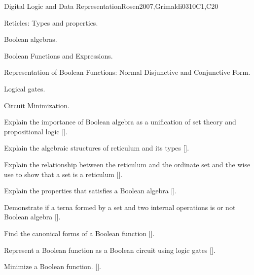 \begin{syllabus}
\begin{unit}{Digital Logic and Data Representation}{}{Rosen2007,Grimaldi03}{10}{C1,C20}
    \begin{topics}
     \item Reticles: Types and properties.
     \item Boolean algebras.
     \item Boolean Functions and Expressions.
     \item Representation of Boolean Functions: Normal Disjunctive and Conjunctive Form.
     \item Logical gates.
     \item Circuit Minimization.
    \end{topics}
 
    \begin{learningoutcomes}
     \item Explain the importance of Boolean algebra as a unification of set theory and propositional logic [\Assessment].
     \item Explain the algebraic structures of reticulum and its types [\Assessment].
     \item Explain the relationship between the reticulum and the ordinate set and the wise use to show that a set is a reticulum [\Assessment].
     \item Explain the properties that satisfies a Boolean algebra [\Assessment].
     \item Demonstrate if a terna formed by a set and two internal operations is or not Boolean algebra [\Assessment].
     \item Find the canonical forms of a Boolean function  [\Assessment].
     \item Represent a Boolean function as a Boolean circuit using logic gates  [\Assessment].
     \item Minimize a Boolean function. [\Assessment].
     \end{learningoutcomes}
  \end{unit}


\end{syllabus}
